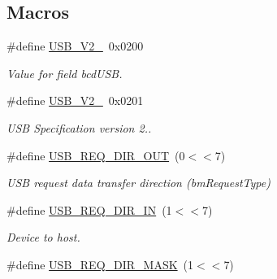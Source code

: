 \subsection*{Macros}
\begin{DoxyCompactItemize}
\item 
\#define \hyperlink{group__usb__protocol__group_ga9bccec980a4f41a481b389b4f0c9c690}{U\-S\-B\-\_\-\-V2\-\_}~0x0200
\begin{DoxyCompactList}\small\item\em Value for field bcd\-U\-S\-B. \end{DoxyCompactList}\item 
\hypertarget{group__usb__protocol__group_ga98059f51cd65930412083d423a70dd17}{\#define \hyperlink{group__usb__protocol__group_ga98059f51cd65930412083d423a70dd17}{U\-S\-B\-\_\-\-V2\-\_}~0x0201}\label{group__usb__protocol__group_ga98059f51cd65930412083d423a70dd17}

\begin{DoxyCompactList}\small\item\em U\-S\-B Specification version 2.. \end{DoxyCompactList}\item 
\#define \hyperlink{group__usb__protocol__group_ga3fae7189eea003bf79ac2949b0f50584}{U\-S\-B\-\_\-\-R\-E\-Q\-\_\-\-D\-I\-R\-\_\-\-O\-U\-T}~(0$<$$<$7)
\begin{DoxyCompactList}\small\item\em U\-S\-B request data transfer direction (bm\-Request\-Type) \end{DoxyCompactList}\item 
\hypertarget{group__usb__protocol__group_ga3d3c24265f68a720887ae4ff7158d605}{\#define \hyperlink{group__usb__protocol__group_ga3d3c24265f68a720887ae4ff7158d605}{U\-S\-B\-\_\-\-R\-E\-Q\-\_\-\-D\-I\-R\-\_\-\-I\-N}~(1$<$$<$7)}\label{group__usb__protocol__group_ga3d3c24265f68a720887ae4ff7158d605}

\begin{DoxyCompactList}\small\item\em Device to host. \end{DoxyCompactList}\item 
\hypertarget{group__usb__protocol__group_gac94f5ec9106e17f2e6d927eeac3d530f}{\#define \hyperlink{group__usb__protocol__group_gac94f5ec9106e17f2e6d927eeac3d530f}{U\-S\-B\-\_\-\-R\-E\-Q\-\_\-\-D\-I\-R\-\_\-\-M\-A\-S\-K}~(1$<$$<$7)}\label{group__usb__protocol__group_gac94f5ec9106e17f2e6d927eeac3d530f}


\end{DoxyCompactItemize}
